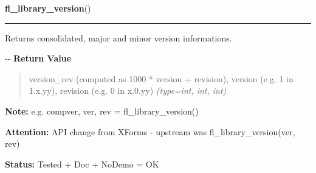 \hspace{.8\funcindent}\begin{boxedminipage}{\funcwidth}

    \raggedright \textbf{fl\_library\_version}()

    \vspace{-1.5ex}

    \rule{\textwidth}{0.5\fboxrule}
\setlength{\parskip}{2ex}

Returns consolidated, major and minor version informations.

-{}-
\setlength{\parskip}{1ex}
      \textbf{Return Value}
    \vspace{-1ex}

      \begin{quote}

version\_rev (computed as 1000 * version + revision), version
(e.g. 1 in 1.x.yy), revision (e.g. 0 in x.0.yy)
      {\it (type=int, int, int)}

      \end{quote}

\textbf{Note:} 
e.g. compver, ver, rev = fl\_library\_version()


\textbf{Attention:} 
API change from XForms - upstream was fl\_library\_version(ver,
rev)


\textbf{Status:} 
Tested + Doc + NoDemo = OK


    \end{boxedminipage}

    \label{xformslib:flbasic:fl_bgn_form}

    \vspace{0.5ex}

